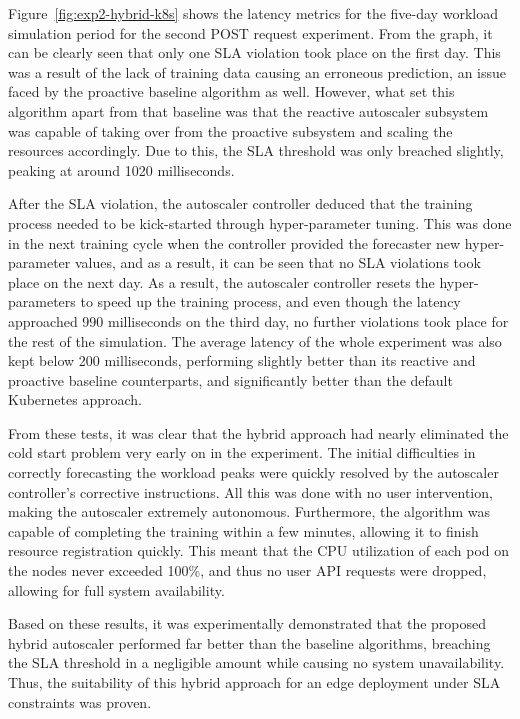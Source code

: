 Figure~\ref{fig:exp2-hybrid-k8s} shows the latency metrics for the five-day workload simulation period for the second POST request experiment. From the graph, it can be clearly seen that only one SLA violation took place on the first day. This was a result of the lack of training data causing an erroneous prediction, an issue faced by the proactive baseline algorithm as well. However, what set this algorithm apart from that baseline was that the reactive autoscaler subsystem was capable of taking over from the proactive subsystem and scaling the resources accordingly. Due to this, the SLA threshold was only breached slightly, peaking at around 1020 milliseconds.\par
After the SLA violation, the autoscaler controller deduced that the training process needed to be kick-started through hyper-parameter tuning. This was done in the next training cycle when the controller provided the forecaster new hyper-parameter values, and as a result, it can be seen that no SLA violations took place on the next day. As a result, the autoscaler controller resets the hyper-parameters to speed up the training process, and even though the latency approached 990 milliseconds on the third day, no further violations took place for the rest of the simulation. The average latency of the whole experiment was also kept below 200 milliseconds, performing slightly better than its reactive and proactive baseline counterparts, and significantly better than the default Kubernetes approach.\par

From these tests, it was clear that the hybrid approach had nearly eliminated the cold start problem very early on in the experiment. The initial difficulties in correctly forecasting the workload peaks were quickly resolved by the autoscaler controller's corrective instructions. All this was done with no user intervention, making the autoscaler extremely autonomous. Furthermore, the algorithm was capable of completing the training within a few minutes, allowing it to finish resource registration quickly. This meant that the CPU utilization of each pod on the nodes never exceeded 100\%, and thus no user API requests were dropped, allowing for full system availability.\par

Based on these results, it was experimentally demonstrated that the proposed hybrid autoscaler performed far better than the baseline algorithms, breaching the SLA threshold in a negligible amount while causing no system unavailability. Thus, the suitability of this hybrid approach for an edge deployment under SLA constraints was proven.

